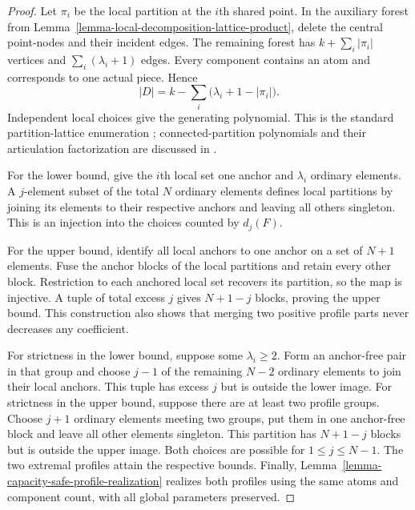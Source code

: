 \documentclass[a4paper,11pt,reqno]{amsart}
\theoremstyle{plain}
\theoremstyle{definition}
\theoremstyle{remark}
\begin{document}
\begin{proof}
Let $\pi_i$ be the local partition at the $i$th shared point.  In the
auxiliary forest from
Lemma~\ref{lemma-local-decomposition-lattice-product}, delete the central
point-nodes and their incident edges.  The remaining forest has
$k+\sum_i|\pi_i|$ vertices and $\sum_i(\lambda_i+1)$ edges.  Every component
contains an atom and corresponds to one actual piece.  Hence
\[
 |D|=k-\sum_i\bigl(\lambda_i+1-|\pi_i|\bigr).
\]
Independent local choices give the generating polynomial.  This is the
standard partition-lattice enumeration
\citep[Example~3.10.4]{stanley2012}; connected-partition polynomials and their
articulation factorization are discussed in \citet[Sections~3--5]{simon2011}.

For the lower bound, give the $i$th local set one anchor and $\lambda_i$
ordinary elements.  A $j$-element subset of the total $N$ ordinary elements
defines local partitions by joining its elements to their respective
anchors and leaving all others singleton.  This is an injection into the
choices counted by $d_j(F)$.

For the upper bound, identify all local anchors to one anchor on a set of
$N+1$ elements.  Fuse the anchor blocks of the local partitions and retain
every other block.  Restriction to each anchored local set recovers its
partition, so the map is injective.  A tuple of total excess $j$ gives
$N+1-j$ blocks, proving the upper bound.  This construction also shows that
merging two positive profile parts never decreases any coefficient.

For strictness in the lower bound, suppose some $\lambda_i\ge2$.  Form an
anchor-free pair in that group and choose $j-1$ of the remaining $N-2$
ordinary elements to join their local anchors.  This tuple has excess $j$
but is outside the lower image.  For strictness in the upper bound, suppose
there are at least two profile groups.  Choose $j+1$ ordinary elements
meeting two groups, put them in one anchor-free block and leave all other
elements singleton.  This partition has $N+1-j$ blocks but is outside the
upper image.  Both choices are possible for $1\le j\le N-1$.
The two extremal profiles attain the respective bounds.  Finally,
Lemma~\ref{lemma-capacity-safe-profile-realization} realizes both profiles
using the same atoms and component count, with all global parameters
preserved.
\end{proof}
\end{document}
